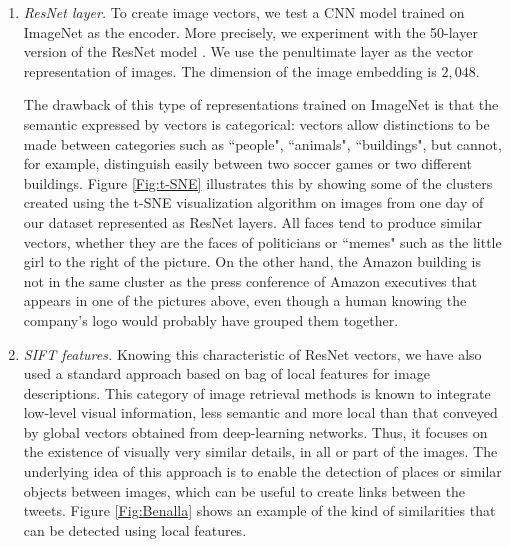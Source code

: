 \begin{enumerate}
    \item{\textit{ResNet layer.}} To create image vectors, we test a CNN model trained on ImageNet as the encoder. More precisely, we experiment with the 50-layer version of the ResNet model \citep{he2016deep}. We use the penultimate layer as the vector representation of images. The dimension of the image embedding is $2,048$.
    
    The drawback of this type of representations trained on ImageNet is that the semantic expressed by vectors is categorical: vectors allow distinctions to be made between categories such as ``people", ``animals", ``buildings", but cannot, for example, distinguish easily between two soccer games or two different buildings. Figure \ref{Fig:t-SNE} illustrates this by showing some of the clusters created using the t-SNE visualization algorithm  \cite{maaten2008visualizing} on images from one day of our dataset represented as ResNet layers. All faces tend to produce similar vectors, whether they are the faces of politicians or ``memes" such as the little girl to the right of the picture. On the other hand, the Amazon building is not in the same cluster as the press conference of Amazon executives that appears in one of the pictures above, even though a human knowing the company's logo would probably have grouped them together.
    
    \item{\textit{SIFT features.}} Knowing this characteristic of ResNet vectors, we have also used a standard approach based on bag of local features for image descriptions. This category of image retrieval methods is known to integrate low-level visual information, less semantic and more local than that conveyed by global vectors obtained from deep-learning networks. Thus, it focuses on the existence of visually very similar details, in all or part of the images. The underlying idea of this approach is to enable the detection of places or similar objects between images, which can be useful to create links between the tweets. Figure \ref{Fig:Benalla} shows an example of the kind of similarities that can be detected using local features.
    

\end{enumerate}
